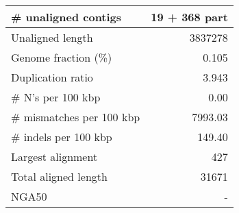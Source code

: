 \documentclass[12pt,a4paper]{article}
\begin{document}
\begin{table}[ht]
\begin{center}
\begin{tabular}{|l*{1}{|r}|}
\# unaligned contigs & 19 + 368 part \\ \hline
Unaligned length & 3837278 \\ \hline
Genome fraction (\%) & 0.105 \\ \hline
Duplication ratio & 3.943 \\ \hline
\# N's per 100 kbp & 0.00 \\ \hline
\# mismatches per 100 kbp & 7993.03 \\ \hline
\# indels per 100 kbp & 149.40 \\ \hline
Largest alignment & 427 \\ \hline
Total aligned length & 31671 \\ \hline
NGA50 & - \\ \hline
\end{tabular}
\end{center}
\end{table}
\end{document}
